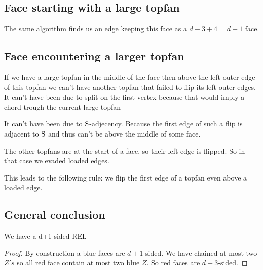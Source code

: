 \subsection{Face starting with a large topfan}
The same algorithm finds us an edge keeping this face as a $ d - 3 +4 = d+1$ face.

\subsection{Face encountering a larger topfan}
If we have a large topfan in the middle of the face then above the left outer edge of this topfan we can't have another topfan that failed to flip its left outer edges.
It can't have been due to split on the first vertex because that would imply a chord trough the current large topfan 

It can't have been due to $\mathrm{S}$-adjecency. Because the first edge of such a flip is adjacent to $\mathrm{S}$ and thus can't be above the middle of some face.

The other topfans are at the start of a face, so their left edge is flipped. So in that case we evaded loaded edges.

This leads to the following rule: we flip the first edge of a topfan even above a loaded edge.


\subsection{General conclusion}
\begin{lemma}
  \label{lm:}
  We have a d+1-sided REL
\end{lemma}

\begin{proof}
  By construction a blue faces are $d+1$-sided. We have  chained at most two $Z's$ so all red face contain at most two blue $Z$. So red faces are $d-3$-sided.
\end{proof}
